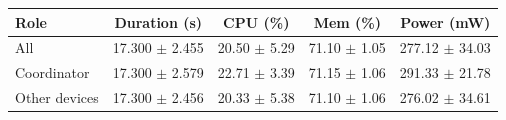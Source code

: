 \begin{tabular}{lcccc}
\hline
\textbf{Role} & \textbf{Duration (s)} & \textbf{CPU (\%)} & \textbf{Mem (\%)} & \textbf{Power (mW)} \\
\hline
All & 17.300 $\pm$ 2.455 & 20.50 $\pm$ 5.29 & 71.10 $\pm$ 1.05 & 277.12 $\pm$ 34.03 \\
Coordinator & 17.300 $\pm$ 2.579 & 22.71 $\pm$ 3.39 & 71.15 $\pm$ 1.06 & 291.33 $\pm$ 21.78 \\
Other devices & 17.300 $\pm$ 2.456 & 20.33 $\pm$ 5.38 & 71.10 $\pm$ 1.06 & 276.02 $\pm$ 34.61 \\
\hline
\end{tabular}
